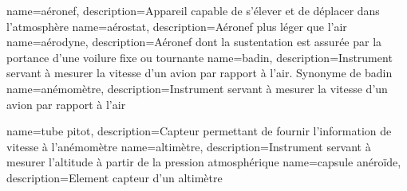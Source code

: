 {
    name=aéronef,
    description={Appareil capable de s'élever et de déplacer dans l'atmosphère}
}
{
    name=aérostat,
    description={Aéronef plus léger que l'air}
}
{
    name=aérodyne,
    description={Aéronef dont la sustentation est assurée par la portance d'une voilure fixe ou tournante}
}
{
    name=badin,
    description={Instrument servant à mesurer la vitesse d'un avion par rapport à l'air. Synonyme de badin}
}
{
    name=anémomètre,
    description={Instrument servant à mesurer la vitesse d'un avion par rapport à l'air}
}

{
    name=tube pitot,
    description={Capteur permettant de fournir l'information de vitesse à l'anémomètre}
}
{
    name=altimètre,
    description={Instrument servant à mesurer l'altitude à partir de la pression atmosphérique}
}
{
    name=capsule anéroïde,
    description={Element capteur d'un altimètre}
}


